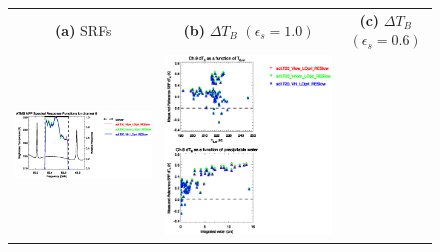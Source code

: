 \begin{figure}[H]
  \centering
  \begin{tabular}{c c c}
    \textsf{\textbf{(a)} SRFs} &
    \textsf{\textbf{(b)} $\Delta T_B$ $(\epsilon_s = 1.0)$} &
    \textsf{\textbf{(c)} $\Delta T_B$ $(\epsilon_s = 0.6)$} \\
    \includegraphics[bb=80 400 280 558,clip,scale=0.85]{graphics/srf/Vset/atms_npp.ch9.osrf.eps} &
    \includegraphics[bb=85 400 260 558,clip,scale=0.85]{graphics/dtb/Vset/e1.0_r0.0/atms_npp.ch9.dTb.eps} & 

\end{tabular}
\end{figure}
